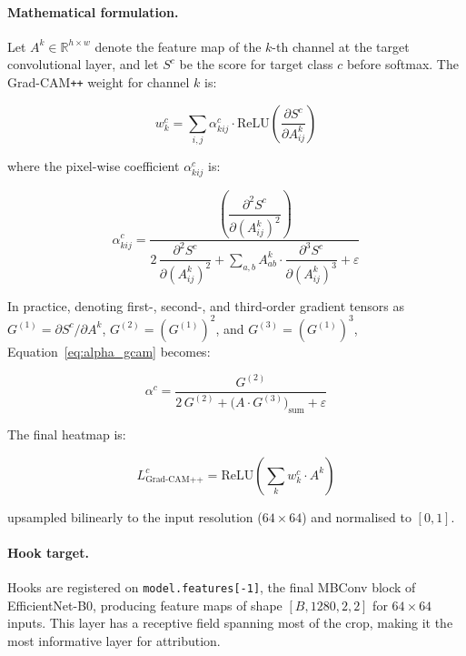 \documentclass[review,12pt]{elsarticle}
\begin{document}
\paragraph{Mathematical formulation.}
Let $A^k \in \mathbb{R}^{h \times w}$ denote the feature map of the
$k$-th channel at the target convolutional layer, and let $S^c$ be the
score for target class $c$ before softmax. The Grad-CAM\texttt{++} weight
for channel $k$ is:

\begin{equation}
  w_k^c = \sum_{i,j} \alpha_{kij}^c \cdot \text{ReLU}
  \!\left(\frac{\partial S^c}{\partial A_{ij}^k}\right)
  \label{eq:gcampp_weight}
\end{equation}

where the pixel-wise coefficient $\alpha_{kij}^c$ is:

\begin{equation}
  \alpha_{kij}^c = \frac{
    \left(\dfrac{\partial^2 S^c}{\partial (A_{ij}^k)^2}\right)
  }{
    2\,\dfrac{\partial^2 S^c}{\partial (A_{ij}^k)^2}
    + \displaystyle\sum_{a,b} A_{ab}^k \cdot
    \dfrac{\partial^3 S^c}{\partial (A_{ij}^k)^3} + \varepsilon
  }
  \label{eq:alpha_gcam}
\end{equation}

In practice, denoting first-, second-, and third-order gradient tensors
as $G^{(1)} = \partial S^c / \partial A^k$, $G^{(2)} = (G^{(1)})^2$,
and $G^{(3)} = (G^{(1)})^3$, Equation~\ref{eq:alpha_gcam} becomes:

\begin{equation}
  \alpha^c = \frac{G^{(2)}}{2\,G^{(2)}
  + \bigl(A \cdot G^{(3)}\bigr)_{\text{sum}} + \varepsilon}
  \label{eq:alpha_gcam_compact}
\end{equation}

The final heatmap is:

\begin{equation}
  L^c_{\text{Grad-CAM++}} = \text{ReLU}
  \!\left(\sum_k w_k^c \cdot A^k\right)
  \label{eq:gcampp_cam}
\end{equation}

upsampled bilinearly to the input resolution ($64 \times 64$) and
normalised to $[0, 1]$.

\paragraph{Hook target.}
Hooks are registered on \texttt{model.features[-1]}, the final MBConv
block of EfficientNet-B0, producing feature maps of shape $[B, 1280, 2, 2]$
for $64\times 64$ inputs. This layer has a receptive field spanning most
of the crop, making it the most informative layer for attribution.
\end{document}
